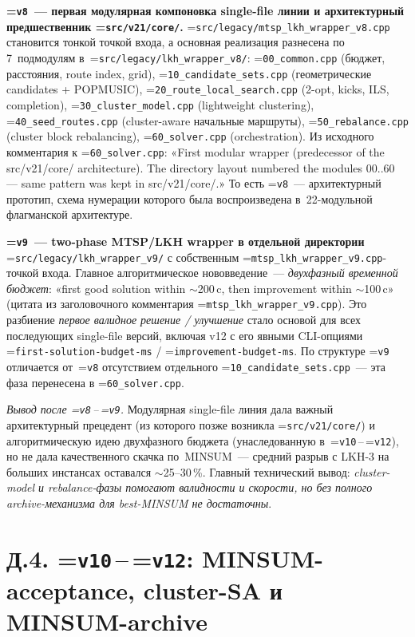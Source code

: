 \documentclass[a4paper,14pt]{extreport}
\makeatletter
\let\old@texttt\texttt
\renewcommand{\texttt}[1]{{\sloppy\hyphenchar\font=\m@ne\old@texttt{#1}}}
\makeatother
\begin{document}
\textbf{\texttt{v8}~--- первая модулярная компоновка single-file линии и архитектурный предшественник \texttt{src/v21/core/}.} \texttt{src/legacy/mtsp\_lkh\_wrapper\_v8.cpp} становится тонкой точкой входа, а основная реализация разнесена по 7~подмодулям в~\texttt{src/legacy/lkh\_wrapper\_v8/}: \texttt{00\_common.cpp} (бюджет, расстояния, route index, grid), \texttt{10\_candidate\_sets.cpp} (геометрические candidates + POPMUSIC), \texttt{20\_route\_local\_search.cpp} (2-opt, kicks, ILS, completion), \texttt{30\_cluster\_model.cpp} (lightweight clustering), \texttt{40\_seed\_routes.cpp} (cluster-aware начальные маршруты), \texttt{50\_rebalance.cpp} (cluster block rebalancing), \texttt{60\_solver.cpp} (orchestration). Из исходного комментария к \texttt{60\_solver.cpp}: «First modular wrapper (predecessor of the src/v21/core/ architecture). The directory layout numbered the modules 00..60 — same pattern was kept in src/v21/core/.» То есть \texttt{v8}~--- архитектурный прототип, схема нумерации которого была воспроизведена в~22-модульной флагманской архитектуре.

\textbf{\texttt{v9}~--- two-phase MTSP/LKH wrapper в отдельной директории} \texttt{src/legacy/lkh\_wrapper\_v9/} с собственным \texttt{mtsp\_lkh\_wrapper\_v9.cpp}-точкой входа. Главное алгоритмическое нововведение~--- \emph{двухфазный временной бюджет}: «first good solution within $\sim$200\,c, then improvement within $\sim$100\,c» (цитата из заголовочного комментария \texttt{mtsp\_lkh\_wrapper\_v9.cpp}). Это разбиение \emph{первое валидное решение / улучшение} стало основой для всех последующих single-file версий, включая v12 с его явными CLI-опциями \texttt{first-solution-budget-ms} / \texttt{improvement-budget-ms}. По структуре \texttt{v9} отличается от~\texttt{v8} отсутствием отдельного \texttt{10\_candidate\_sets.cpp}~--- эта фаза перенесена в \texttt{60\_solver.cpp}.

\textit{Вывод после \texttt{v8}\,--\,\texttt{v9}.} Модулярная single-file линия дала важный архитектурный прецедент (из которого позже возникла \texttt{src/v21/core/}) и алгоритмическую идею двухфазного бюджета (унаследованную в~\texttt{v10}\,--\,\texttt{v12}), но не дала качественного скачка по~MINSUM~--- средний разрыв с LKH-3 на больших инстансах оставался $\sim$25--30\,\%. Главный технический вывод: \emph{cluster-model и rebalance-фазы помогают валидности и скорости, но без полного archive-механизма для best-MINSUM не достаточны}.

\section*{Д.4. \texttt{v10}\,--\,\texttt{v12}: MINSUM-acceptance, cluster-SA и MINSUM-archive}
\end{document}

